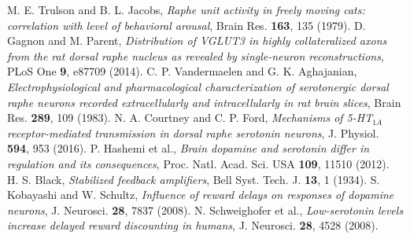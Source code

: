  M. E. Trulson and B. L. Jacobs, \emph{Raphe unit activity in freely moving cats: correlation with level of behavioral arousal}, Brain Res. \textbf{163}, 135 (1979).
 D. Gagnon and M. Parent, \emph{Distribution of VGLUT3 in highly collateralized axons from the rat dorsal raphe nucleus as revealed by single-neuron reconstructions}, PLoS One \textbf{9}, e87709 (2014).
 C. P. Vandermaelen and G. K. Aghajanian, \emph{Electrophysiological and pharmacological characterization of serotonergic dorsal raphe neurons recorded extracellularly and intracellularly in rat brain slices}, Brain Res. \textbf{289}, 109 (1983).
 N. A. Courtney and C. P. Ford, \emph{Mechanisms of 5-HT$_{1A}$ receptor-mediated transmission in dorsal raphe serotonin neurons}, J. Physiol. \textbf{594}, 953 (2016).
 P. Hashemi et al., \emph{Brain dopamine and serotonin differ in regulation and its consequences}, Proc. Natl. Acad. Sci. USA \textbf{109}, 11510 (2012).
 H. S. Black, \emph{Stabilized feedback amplifiers}, Bell Syst. Tech. J. \textbf{13}, 1 (1934).
 S. Kobayashi and W. Schultz, \emph{Influence of reward delays on responses of dopamine neurons}, J. Neurosci. \textbf{28}, 7837 (2008).
 N. Schweighofer et al., \emph{Low-serotonin levels increase delayed reward discounting in humans}, J. Neurosci. \textbf{28}, 4528 (2008).
